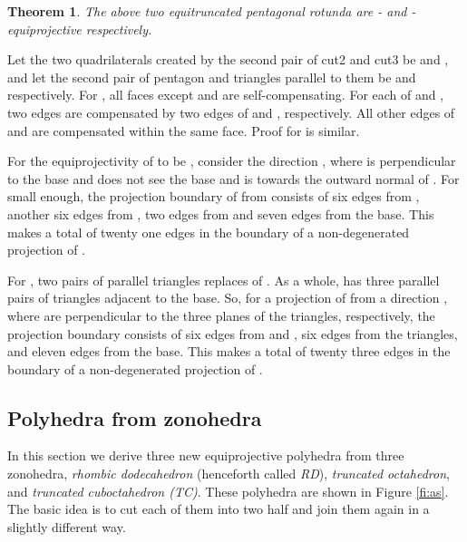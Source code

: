 \documentclass{article}
\newtheorem{theorem}{Theorem}
\newenvironment{proof}
{{\noindent\bf Proof}}{}
\begin{document}
\begin{theorem}
The above two equitruncated pentagonal rotunda are - and -equiprojective respectively.
\end{theorem}

\begin{proof}
Let the two quadrilaterals created by the second pair of cut2 and cut3 be  and ,
and let the second pair of pentagon and triangles parallel to them be  and  respectively.
For , all faces except  and  are self-compensating.
For each of  and , two edges are compensated by two edges of 
 and , respectively.
All other edges of  and  are compensated within the same face.
Proof for  is similar.

For the equiprojectivity of  to be , consider the direction ,
where  is perpendicular to the base and does not see the base
and  is towards the outward normal of .
For  small enough, the projection boundary of  from 
 consists of six edges from , another six edges from ,
two edges from  and seven edges from the base.
This makes a total of twenty one edges in the boundary of a non-degenerated projection of .

For , two pairs of parallel triangles replaces  of .
As a whole,  has three parallel pairs of triangles adjacent to the base.
So, for a projection of  from a direction ,
where  are perpendicular to the
three planes of the triangles, respectively, 
the projection boundary consists of six edges from  and , 
six edges from the triangles, and eleven edges from the base.
This makes a total of twenty three edges in the boundary of a non-degenerated projection of .
\end{proof}


\subsection{Polyhedra from zonohedra}

In this section we derive three new equiprojective polyhedra from
three zonohedra, \emph{rhombic dodecahedron} (henceforth called \emph{RD}),
\emph{truncated octahedron}, and \emph{truncated cuboctahedron (TC)}.
These polyhedra are shown in Figure \ref{fi:as}.
The basic idea is to cut each of them into two half and join them again in a slightly different way.
\end{document}
